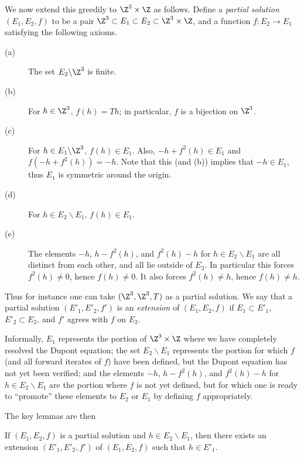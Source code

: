 We now extend this greedily to $\Z^3 \times \Z$ as follows.  Define a \emph{partial solution} $(E_1,E_2,f)$ to be a pair $\Z^3 \subset E_1 \subset E_2 \subset \Z^3 \times \Z$, and a function $f: E_2 \to E_1$ satisfying the following axioms.
\begin{description}
  \item[(a)] The set $E_2 \backslash \Z^3$ is finite.
  \item[(b)] For $h \in \Z^3$, $f(h) = Th$; in particular, $f$ is a bijection on $\Z^3$.
  \item[(c)] For $h \in E_1 \backslash \Z^3$, $f(h) \in E_1$.  Also, $-h + f^2(h) \in E_1$ and $f(-h + f^2(h)) = -h$. Note that this (and (b)) implies that $-h \in E_1$, thus $E_1$ is symmetric around the origin.
  \item[(d)] For $h \in E_2 \backslash E_1$, $f(h) \in E_1$.
  \item[(e)] The elements $-h$, $h - f^2(h)$, and $f^2(h) - h$ for $h \in E_2 \backslash E_1$ are all distinct from each other, and all lie outside of $E_2$.  In particular this forces $f^2(h) \neq 0$, hence $f(h) \neq 0$. It also forces $f^2(h) \neq h$, hence $f(h) \neq h$.
\end{description}
Thus for instance one can take $(\Z^3,\Z^3,T)$ as a partial solution.  We say that a partial solution $(E'_1, E'_2, f')$ is an \emph{extension} of $(E_1,E_2,f)$ if $E_1 \subset E'_1$, $E'_2 \subset E_2$, and $f'$ agrees with $f$ on $E_2$.

Informally, $E_1$ represents the portion of $\Z^3 \times \Z$ where we have completely resolved the Dupont equation; the set $E_2 \backslash E_1$ represents the portion for which $f$ (and all forward iterates of $f$) have been defined, but the Dupont equation has not yet been verified; and the elements $-h$, $h - f^2(h)$, and $f^2(h) - h$ for $h \in E_2 \backslash E_1$ are the portion where $f$ is not yet defined, but for which one is ready to ``promote'' these elements to $E_2$ or $E_1$ by defining $f$ appropriately.

The key lemmas are then

\begin{lemma}[Promoting to $E_1$]\label{add-E1}  If $(E_1,E_2,f)$ is a partial solution and $h \in E_2 \backslash E_1$, then there exists an extension $(E'_1,E'_2,f')$ of $(E_1,E_2,f)$ such that $h \in E'_1$.
\end{lemma}

